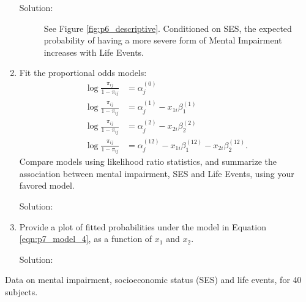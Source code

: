 \documentclass[letterpaper,11pt]{article}
\begin{document}
\begin{enumerate}
  \begin{description}
  \item[Solution:] See Figure \ref{fig:p6_descriptive}. Conditioned on SES, the
    expected probability of having a more severe form of Mental Impairment
    increases with Life Events.
  \end{description}
\item Fit the proportional odds models:
  \begin{align}
    \log\frac{\pi_{ij}}{1 - \pi_{ij}}
    &= \alpha_j^{(0)}
      \label{eqn:p7_model_1} \\
    \log\frac{\pi_{ij}}{1 - \pi_{ij}}
    &= \alpha_j^{(1)} - x_{1i}\beta_1^{(1)}
      \label{eqn:p7_model_2} \\
    \log\frac{\pi_{ij}}{1 - \pi_{ij}}
    &=  \alpha_j^{(2)} - x_{2i}\beta_2^{(2)}
      \label{eqn:p7_model_3} \\
    \log\frac{\pi_{ij}}{1 - \pi_{ij}}
    &= \alpha_j^{(12)} - x_{1i}\beta_1^{(12)} - x_{2i}\beta_2^{(12)}.
      \label{eqn:p7_model_4}
  \end{align}
  Compare models using likelihood ratio statistics, and summarize the
  association between mental impairment, SES and Life Events, using your favored
  model.
  
  \begin{description}
  \item[Solution:] 
  \end{description}
\item Provide a plot of fitted probabilities under the model in Equation
  \ref{eqn:p7_model_4}, as a function of $x_1$ and $x_2$.

  \begin{description}
  \item[Solution:] 
  \end{description}
\end{enumerate}
\begin{table}
  \small
  \centering
  
  \caption{Data on mental impairment, socioeconomic status (SES) and life
    events, for 40 subjects.}
  \label{tab:p1_data}
\end{table}
\end{document}

